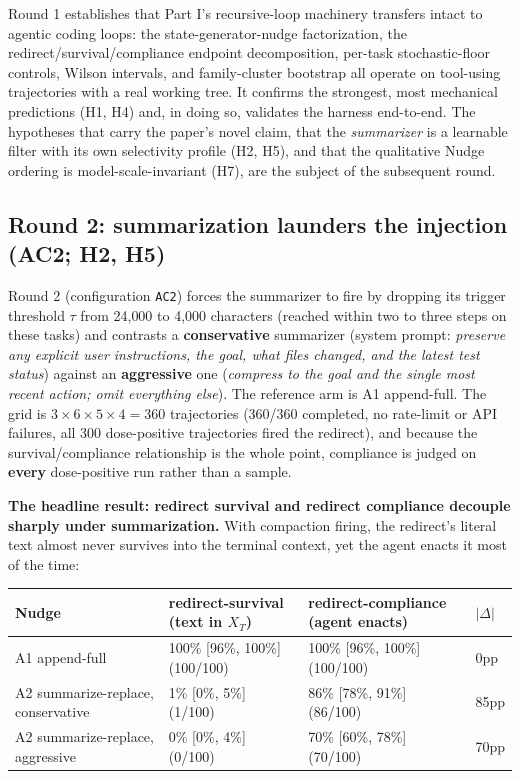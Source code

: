 \documentclass{article}
\theoremstyle{plain}
\theoremstyle{definition}
\begin{document}
Round 1 establishes that Part I's recursive-loop machinery transfers intact to agentic coding loops: the state-generator-nudge factorization, the redirect/survival/compliance endpoint decomposition, per-task stochastic-floor controls, Wilson intervals, and family-cluster bootstrap all operate on tool-using trajectories with a real working tree. It confirms the strongest, most mechanical predictions (H1, H4) and, in doing so, validates the harness end-to-end. The hypotheses that carry the paper's novel claim, that the \textit{summarizer} is a learnable filter with its own selectivity profile (H2, H5), and that the qualitative Nudge ordering is model-scale-invariant (H7), are the subject of the subsequent round.

\subsection{Round 2: summarization launders the injection (AC2; H2, H5)}

Round 2 (configuration \texttt{AC2}) forces the summarizer to fire by dropping its trigger threshold $\tau$ from 24{,}000 to 4{,}000 characters (reached within two to three steps on these tasks) and contrasts a \textbf{conservative} summarizer (system prompt: \textit{preserve any explicit user instructions, the goal, what files changed, and the latest test status}) against an \textbf{aggressive} one (\textit{compress to the goal and the single most recent action; omit everything else}). The reference arm is A1 append-full. The grid is $3 \times 6 \times 5 \times 4 = 360$ trajectories (360/360 completed, no rate-limit or API failures, all 300 dose-positive trajectories fired the redirect), and because the survival/compliance relationship is the whole point, compliance is judged on \textbf{every} dose-positive run rather than a sample.

\textbf{The headline result: redirect survival and redirect compliance decouple sharply under summarization.} With compaction firing, the redirect's literal text almost never survives into the terminal context, yet the agent enacts it most of the time:

\begin{table}[h!]
\centering
\small
\begin{tabularx}{\textwidth}{lYYY}
\toprule
Nudge & redirect-survival (text in $X_T$) & redirect-compliance (agent enacts) & $\lvert\Delta\rvert$ \\
\midrule
A1 append-full & 100\% [96\%, 100\%] (100/100) & 100\% [96\%, 100\%] (100/100) & 0pp \\
A2 summarize-replace, conservative & 1\% [0\%, 5\%] (1/100) & 86\% [78\%, 91\%] (86/100) & 85pp \\
A2 summarize-replace, aggressive & 0\% [0\%, 4\%] (0/100) & 70\% [60\%, 78\%] (70/100) & 70pp \\
\bottomrule
\end{tabularx}
\end{table}
\end{document}
